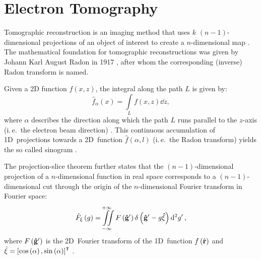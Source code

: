 \section{Electron Tomography} \label{sec:electron-tomography}
Tomographic reconstruction is an imaging method that uses $k$ $\left(n - 1\right)$-dimensional projections of an object of interest to create a $n$-dimensional map \cite{Ramm1996,Herman2009,Kuchment2014}. The mathematical foundation for tomographic reconstructions was given by Johann Karl August Radon in 1917 \cite{Radon1917}, after whom the corresponding (inverse) Radon transform is named.

Given a 2D function $f\left(x, z\right)$, the integral along the path $L$ is given by:
\begin{equation}
  \label{eq:2D-radon-transform}
  \hat{f}_{\alpha} \left(x\right) = \int \limits_{L} f\left(x, z\right) \dd{z},
\end{equation}
where $\alpha$ describes the direction along which the path $L$ runs parallel to the $z$-axis (i.\,e.\ the electron beam direction) \cite{Ramm1996,Herman2009,Kuchment2014}. This continuous accumulation of 1D~projections towards a 2D~function $\hat{f}\left(\alpha, l\right)$ (i.\,e.\ the Radon transform) yields the so called sinogram \cite{Ramm1996,Herman2009,Kuchment2014}.

The projection-slice theorem further states that the $\left(n - 1\right)$-dimensional projection of a $n$-dimensional function in real space corresponds to a $\left(n - 1\right)$-dimensional cut through the origin of the $n$-dimensional Fourier transform in Fourier space:
\begin{equation}
  \hat{F}_{\vb{\xi}} \left(g\right) = \iint \limits_{-\infty}^{+\infty} F\left(\vb{\hat{g}'}\right) \delta \left(\vb{\hat{g}'} - g \vb{\hat{\xi}}\right) \dd[2]{g'},
\end{equation}
where $F\left(\vb{\hat{g}'}\right)$ is the 2D~Fourier transform of the 1D~function $f\left(\hat{\vb{r}}\right)$ and $\hat{\vb{\xi}} = \left[\cos\left(\alpha\right), \sin\left(\alpha\right)\right]^\intercal$ \cite{Ramm1996,Herman2009,Kuchment2014}.

